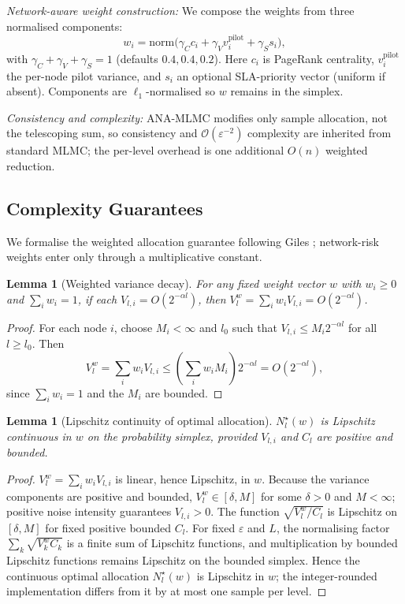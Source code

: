 \documentclass[journal]{IEEEtran}
\newtheorem{lemma}[theorem]{Lemma}
\begin{document}
\textit{Network-aware weight construction:}
We compose the weights from three normalised components:
\begin{equation}
    w_i = \mathrm{norm}\bigl(\gamma_C c_i
                + \gamma_V v_i^{\text{pilot}}
                + \gamma_S s_i\bigr),
    \label{eq:ana_weights}
\end{equation}
with $\gamma_C+\gamma_V+\gamma_S=1$ (defaults $0.4,0.4,0.2$). Here $c_i$ is PageRank centrality,
$v_i^{\text{pilot}}$ the per-node pilot variance, and $s_i$ an optional SLA-priority vector
(uniform if absent). Components are $\ell_1$-normalised so $w$ remains in the simplex.

\textit{Consistency and complexity:}
ANA-MLMC modifies only sample allocation, not the telescoping sum, so consistency and
$\mathcal{O}(\varepsilon^{-2})$ complexity are inherited from standard MLMC; the per-level
overhead is one additional $O(n)$ weighted reduction.

\subsection{Complexity Guarantees}
\label{subsec:complexity}

We formalise the weighted allocation guarantee following Giles \cite{giles2015multilevel};
network-risk weights enter only through a multiplicative constant.

\begin{lemma}[Weighted variance decay]
\label{lem:weighted_variance}
For any fixed weight vector $w$ with $w_i \geq 0$ and $\sum_i w_i = 1$, if each
$V_{l,i}=O(2^{-\alpha l})$, then
$V_l^w=\sum_i w_i V_{l,i}=O(2^{-\alpha l})$.
\end{lemma}
\begin{proof}
For each node $i$, choose $M_i<\infty$ and $l_0$ such that
$V_{l,i}\leq M_i2^{-\alpha l}$ for all $l\geq l_0$. Then
\[
V_l^w=\sum_i w_i V_{l,i}
\leq \left(\sum_i w_i M_i\right)2^{-\alpha l}
=O(2^{-\alpha l}),
\]
since $\sum_i w_i=1$ and the $M_i$ are bounded.
\end{proof}

\begin{lemma}[Lipschitz continuity of optimal allocation]
\label{lem:lipschitz_allocation}
$N_l^\star(w)$ is Lipschitz continuous in $w$ on the probability simplex, provided
$V_{l,i}$ and $C_l$ are positive and bounded.
\end{lemma}
\begin{proof}
$V_l^w=\sum_i w_i V_{l,i}$ is linear, hence Lipschitz, in $w$. Because the variance components
are positive and bounded, $V_l^w \in [\delta,M]$ for some $\delta>0$ and $M<\infty$; positive
noise intensity guarantees $V_{l,i}>0$. The function $\sqrt{V_l^w/C_l}$ is Lipschitz on
$[\delta,M]$ for fixed positive bounded $C_l$. For fixed $\varepsilon$ and $L$, the normalising
factor $\sum_k\sqrt{V_k^w C_k}$ is a finite sum of Lipschitz functions, and multiplication by
bounded Lipschitz functions remains Lipschitz on the bounded simplex. Hence the continuous
optimal allocation $N_l^\star(w)$ is Lipschitz in $w$; the integer-rounded implementation differs
from it by at most one sample per level.
\end{proof}
\end{document}
